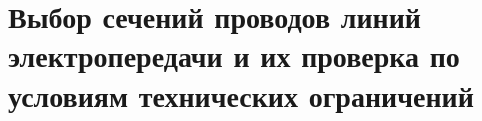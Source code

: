 \chapter{Выбор сечений проводов линий электропередачи и их проверка по условиям технических ограничений}
\label{cha:sech_provod}


